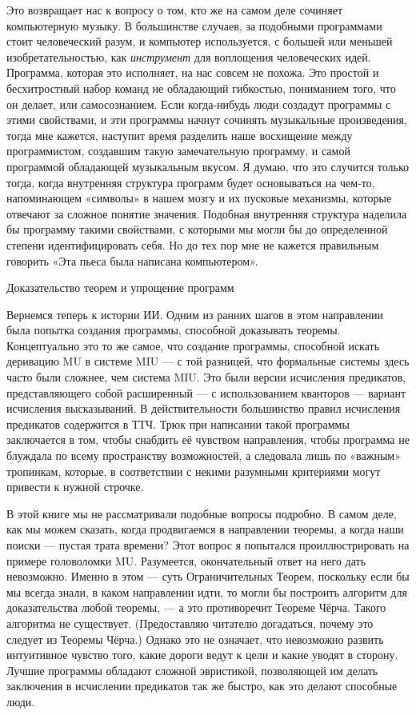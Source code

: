 \documentclass[../main.tex]{subfiles}
\begin{document}
Это возвращает нас к вопросу о том, кто же на самом деле сочиняет компьютерную музыку. В большинстве случаев, за подобными программами стоит человеческий разум, и компьютер используется, с большей или меньшей изобретательностью, как \emph{инструмент} для воплощения человеческих идей. Программа, которая это исполняет, на нас совсем не похожа. Это простой и бесхитростный набор команд не обладающий гибкостью, пониманием того, что он делает, или самосознанием. Если когда-нибудь люди создадут программы с этими свойствами, и эти программы начнут сочинять музыкальные произведения, тогда мне кажется, наступит время разделить наше восхищение между программистом, создавшим такую замечательную программу, и самой программой обладающей музыкальным вкусом. Я думаю, что это случится только тогда, когда внутренняя структура программ будет основываться на чем-то, напоминающем «символы» в нашем мозгу и их пусковые механизмы, которые отвечают за сложное понятие значения. Подобная внутренняя структура наделила бы программу такими свойствами, с которыми мы могли бы до определенной степени идентифицировать себя. Но до тех пор мне не кажется правильным говорить «Эта пьеса была написана компьютером».

Доказательство теорем и упрощение программ

Вернемся теперь к истории ИИ\@. Одним из ранних шагов в этом направлении была попытка создания программы, способной доказывать теоремы. Концептуально это то же самое, что создание программы, способной искать деривацию MU в системе MIU --- с той разницей, что формальные системы здесь часто были сложнее, чем система MIU\@. Это были версии исчисления предикатов, представляющего собой расширенный --- с использованием кванторов --- вариант исчисления высказываний. В действительности большинство правил исчисления предикатов содержится в ТТЧ\@. Трюк при написании такой программы заключается в том, чтобы снабдить её чувством направления, чтобы программа не блуждала по всему пространству возможностей, а следовала лишь по «важным» тропинкам, которые, в соответствии с некими разумными критериями могут привести к нужной строчке.

В этой книге мы не рассматривали подобные вопросы подробно. В самом деле, как мы можем сказать, когда продвигаемся в направлении теоремы, а когда наши поиски --- пустая трата времени? Этот вопрос я попытался проиллюстрировать на примере головоломки MU\@. Разумеется, окончательный ответ на него дать невозможно. Именно в этом --- суть Ограничительных Теорем, поскольку если бы мы всегда знали, в каком направлении идти, то могли бы построить алгоритм для доказательства любой теоремы, --- а это противоречит Теореме Чёрча. Такого алгоритма не существует. (Предоставляю читателю догадаться, почему это следует из Теоремы Чёрча.) Однако это не означает, что невозможно развить интуитивное чувство того, какие дороги ведут к цели и какие уводят в сторону. Лучшие программы обладают сложной эвристикой, позволяющей им делать заключения в исчислении предикатов так же быстро, как это делают способные люди.
\end{document}
